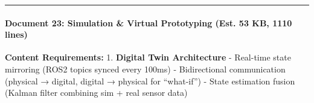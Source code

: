 \documentclass[
]{article}
\begin{document}
\begin{center}\rule{0.5\linewidth}{0.5pt}\end{center}

\hypertarget{document-23-simulation-virtual-prototyping-est.-53-kb-1110-lines}{%
\paragraph{Document 23: Simulation \& Virtual Prototyping (Est. 53 KB,
1110
lines)}\label{document-23-simulation-virtual-prototyping-est.-53-kb-1110-lines}}

\textbf{Content Requirements:} 1. \textbf{Digital Twin Architecture} -
Real-time state mirroring (ROS2 topics synced every 100ms) -
Bidirectional communication (physical → digital, digital → physical for
``what-if'') - State estimation fusion (Kalman filter combining sim +
real sensor data)
\end{document}
